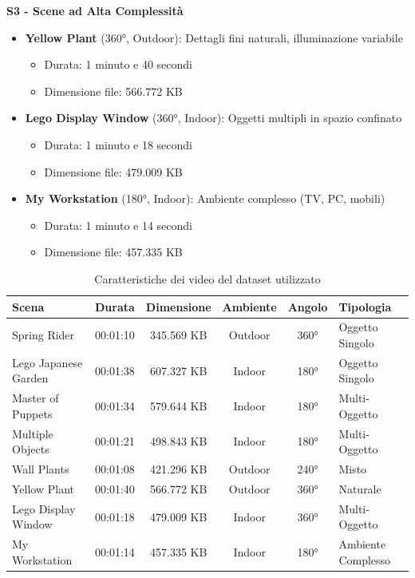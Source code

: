 \textbf{S3 - Scene ad Alta Complessità}
\begin{itemize}
	\item \textbf{Yellow Plant} (360°, Outdoor): Dettagli fini naturali, illuminazione variabile
	\begin{itemize}
		\item Durata: 1 minuto e 40 secondi
		\item Dimensione file: 566.772 KB
	\end{itemize}
	
	\item \textbf{Lego Display Window} (360°, Indoor): Oggetti multipli in spazio confinato
	\begin{itemize}
		\item Durata: 1 minuto e 18 secondi
		\item Dimensione file: 479.009 KB
	\end{itemize}
	
	\item \textbf{My Workstation} (180°, Indoor): Ambiente complesso (TV, PC, mobili)
	\begin{itemize}
		\item Durata: 1 minuto e 14 secondi
		\item Dimensione file: 457.335 KB
	\end{itemize}
\end{itemize}

\begin{table}[htbp]
	\centering
	\caption{Caratteristiche dei video del dataset utilizzato}
	\label{tab:video_dataset_caratteristiche}
	\begin{tabular}{|p{3cm}|c|c|c|c|p{2.5cm}|}
		\hline
		\textbf{Scena} & \textbf{Durata} & \textbf{Dimensione} & \textbf{Ambiente} & \textbf{Angolo} & \textbf{Tipologia} \\
		\hline
		Spring Rider & 00:01:10 & 345.569 KB & Outdoor & 360° & Oggetto Singolo \\
		Lego Japanese Garden & 00:01:38 & 607.327 KB & Indoor & 180° & Oggetto Singolo \\
		Master of Puppets & 00:01:34 & 579.644 KB & Indoor & 180° & Multi-Oggetto \\
		Multiple Objects & 00:01:21 & 498.843 KB & Indoor & 180° & Multi-Oggetto \\
		Wall Plants & 00:01:08 & 421.296 KB & Outdoor & 240° & Misto \\
		Yellow Plant & 00:01:40 & 566.772 KB & Outdoor & 360° & Naturale \\
		Lego Display Window & 00:01:18 & 479.009 KB & Indoor & 360° & Multi-Oggetto \\
		My Workstation & 00:01:14 & 457.335 KB & Indoor & 180° & Ambiente Complesso \\
		\hline
	\end{tabular}
\end{table}


